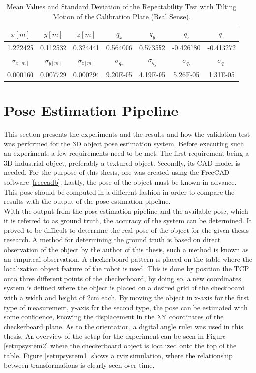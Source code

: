 \begin{table}[ht]
\renewcommand{\arraystretch}{1.3}
\caption{Mean Values and Standard Deviation  of the Repeatability Test with Tilting Motion of the Calibration Plate (Real Sense).}
\label{meanreal2}
\centering
\begin{tabular}{|c||c||c||c||c||c||c|}
\hline
$x[m]$ & $y[m]$ & $z[m]$ & $q_{x}$ & $q_{y}$ & $q_{z}$ &$q_{\omega}$ \\
\hline
1.222425&	0.112532&	0.324441&0.564006&	0.573552&	-0.426780&	-0.413272  \\
\hline
\hline
$\sigma_{x[m]}$ & $\sigma_{y[m]}$ & $\sigma_{z[m]}$ & $\sigma_{q_{x}}$ & $\sigma_{q_{y}}$ & $\sigma_{q_{z}}$ &$\sigma_{q_{\omega}}$ \\
\hline
0.000160&	0.007729&	0.000294&9.20E-05&	4.19E-05&	5.26E-05&	1.31E-05\\
\hline
\end{tabular}
\end{table}


\section{Pose Estimation Pipeline}

This section presents the experiments and the results and how the validation test was performed for the 3D object pose estimation system. Before executing such an experiment, a few requirements need to be met. The first requirement being a 3D industrial object, preferably a textured object. Secondly, its CAD model is needed. For the purpose of this thesis, one was created using the FreeCAD software \ref{freecadb}. Lastly, the pose of the object must be known in advance. This pose should be computed in a different fashion in order to compare the results with the output of the pose estimation pipeline.\\
With the output from the pose estimation pipeline and the available pose, which it is referred to as ground truth, the accuracy of the system can be determined. It proved to be difficult to determine the real pose of the object for the given thesis research. A method for determining the ground truth is based on direct observation of the object by the author of this thesis, such a method is known as an empirical observation. A checkerboard pattern is placed on the table where the localization object feature of the robot is used. This is done by position the TCP onto three different points of the checkerboard, by doing so, a new coordinates system is defined where the object is placed on a desired grid of the checkboard with a width and height of 2cm each. By moving the object in x-axis for the first type of measurement, y-axis for the second type, the pose can be estimated with some confidence, knowing the displacement in the XY coordinates of  the checkerboard plane. As to the orientation, a digital angle ruler was used in this thesis. An overview of the setup for the experiment can be seen in Figure \ref{setupsystem2} where the checkerboard object is localized onto the top of the table. Figure \ref{setupsystem1} shows a rviz simulation, where the relationship between transformations is clearly seen over time. 


